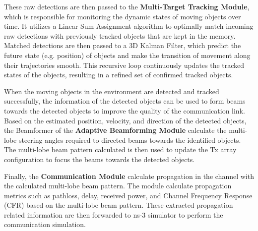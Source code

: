 These raw detections are then passed to the \textbf{Multi-Target Tracking Module}, which is responsible for monitoring the dynamic states of moving objects over time.
It utilizes a Linear Sum Assignment algorithm to optimally match incoming raw detections with previously tracked objects that are kept in the memory.
Matched detections are then passed to a 3D Kalman Filter, which predict the future state (e.g. position) of objects and make the transition of movement along their trajectories smooth.
This recursive loop continuously updates the tracked states of the objects, resulting in a refined set of confirmed tracked objects.

When the moving objects in the environment are detected and tracked successfully, the information of the detected objects can be used to form beams towards the detected objects to improve the quality of the communication link.
Based on the estimated position, velocity, and direction of the detected objects, the Beamformer of the \textbf{Adaptive Beamforming Module} calculate the multi-lobe steering angles required to directed beams towards the identified objects.
The multi-lobe beam pattern calculated is then used to update the Tx array configuration to focus the beams towards the detected objects.

Finally, the \textbf{Communication Module} calculate propagation in the channel  with the calculated multi-lobe beam pattern.
The module calculate propagation metrics such as pathloss, delay, received power, and Channel Frequency Response (CFR) based on the multi-lobe beam pattern.
These extracted propagation related information are then forwarded to ns-3 simulator to perform the communication simulation.